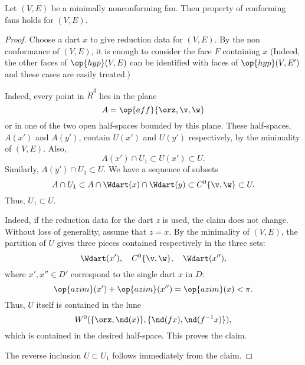 
\begin{lemma}[]\cutrate{} Let $(V,E)$ be a minimally nonconforming fan.  Then property  of conforming fans
holds for $(V,E)$.
\end{lemma}
%

\begin{proof}
  Choose a dart $x$ to give reduction data for $(V,E)$.  By the non
  conformance of $(V,E)$, it is enough to consider the face $F$
  containing $x$ (Indeed, the other faces of $\op{hyp}(V,E)$ can be
  identified with faces of $\op{hyp}(V,E')$ and these cases are easily
  treated.)  

Indeed,  every
  point in $\ring{R}^3$ lies in the plane
\[ 
A=\op{aff}\{\orz,\v,\w\}
\] 
or in one of the two open half-spaces bounded by this plane.  These
half-spaces, $A(x')$ and $A(y')$, contain $U(x')$ and $U(y')$
respectively, by the minimality of $(V,E)$.  Also,
\[ 
A(x')\cap U_1 \subset U(x')\subset U.
\] 
Similarly, $A(y')\cap U_1 \subset U$.  We have a sequence of subsets
\[ 
A \cap U_1 \subset A \cap \Wdart(x) \cap \Wdart(y) \subset C^0\{\v,\w\} \subset U.
\] 
Thus,
$U_1\subset U$.

 Indeed,
if the reduction data for the dart $z$ is used, the claim does not change.
Without loss of generality, assume that $z=x$.  By the minimality of $(V,E)$, the
partition  of $U$ gives three pieces contained respectively
in the three sets:
\[ 
\Wdart(x'),\quad C^0\{\v,\w\},\quad \Wdart(x''),
\] 
where $x',x''\in D'$ correspond to the single dart $x$ in $D$:
\[ 
\op{azim}(x') + \op{azim}(x'') = \op{azim}(x) < \pi.
\] 
Thus, $U$ itself is contained in the lune
\[ 
W^0(\{\orz,\nd(x)\},\{\nd(f x),\nd(f^{-1} x)\}),
\] 
which is contained in the desired half-space.  This proves the claim.

The reverse inclusion $U\subset U_1$ follows immediately from the claim.
\end{proof}

